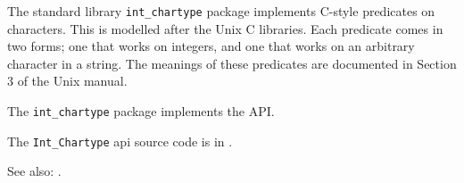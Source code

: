 
The standard library {\tt int\_chartype} package implements 
C-style predicates on characters.  This is modelled after the Unix C libraries.  
Each predicate comes in two forms; one that works on integers, and one 
that works on an arbitrary character in a string.  The meanings of these 
predicates are documented in Section 3 of the Unix manual. 

The {\tt int\_chartype} package implements the  API.

The {\tt Int\_Chartype} api source code is in .

See also: .
